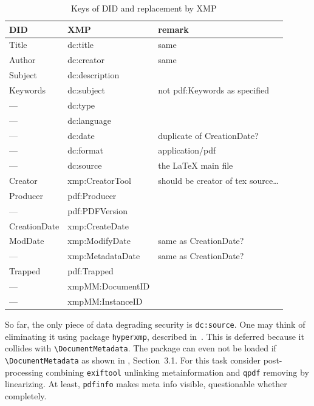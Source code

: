 \documentclass[a4paper]{article}%
\newcommand{\cmd}[1]{\texttt{\textbackslash#1}}
\begin{document}
\begin{longtable}{lll}
  \toprule
  DID          & XMP              & remark \\
  \midrule
  \midrule
  \endfirsthead%
  \bottomrule
  \caption{\label{tab:keysDID_XMP} Keys of DID and replacement by XMP}
  \endlastfoot%
  Title        & dc:title         & same\\
  Author       & dc:creator       & same \\
  Subject      & dc:description   & \\
  Keywords     & dc:subject       & not pdf:Keywords as specified \\
  ---          & dc:type          & \\
  ---          & dc:language      & \\
  ---          & dc:date          & duplicate of CreationDate? \\
  ---          & dc:format        & application/pdf \\
  ---          & dc:source        & the \LaTeX{} main file \\%
  Creator      & xmp:CreatorTool  & should be creator of tex source\dots \\
  Producer     & pdf:Producer     & \\
  ---          & pdf:PDFVersion   & \\
  CreationDate & xmp:CreateDate   & \\
  ModDate      & xmp:ModifyDate   & same as CreationDate? \\
  ---          & xmp:MetadataDate & same as CreationDate? \\
  Trapped      & pdf:Trapped      & \\
  ---          & xmpMM:DocumentID & \\
  ---          & xmpMM:InstanceID & \\
\end{longtable}

So far, the only piece of data degrading security 
is \texttt{dc:source}. 
One may think of eliminating it using package \texttt{hyperxmp}, 
described in~\cite{HyperXmpP}. 
This is deferred because it collides with \cmd{DocumentMetadata}. 
The package can even not be loaded if \cmd{DocumentMetadata} as shown in \cite{HyperXmpP}, Section~3.1. 
For this task consider post-processing combining \texttt{exiftool} unlinking metainformation and 
\texttt{qpdf} removing by linearizing. 
At least, \texttt{pdfinfo} makes meta info visible, questionable whether completely. 
\end{document}
